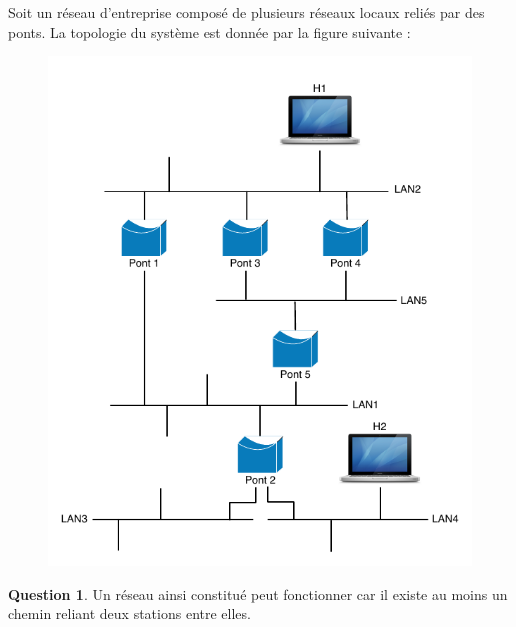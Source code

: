 \documentclass[11pt,english,french]{scrreprt}
\theoremstyle{remark}
\theoremstyle{definition}
\newtheorem{ques}{Question}[section]
\begin{document}
Soit un réseau d'entreprise composé de plusieurs réseaux locaux reliés par des ponts. La topologie du système est donnée par la figure suivante :
\begin{figure}[h]
	\center
	\includegraphics[scale=1]{Exam2009/LAN}
\end{figure}

\begin{ques}
	Un réseau ainsi constitué peut fonctionner car il existe au moins un chemin reliant deux stations entre elles.
\end{ques}
\end{document}
